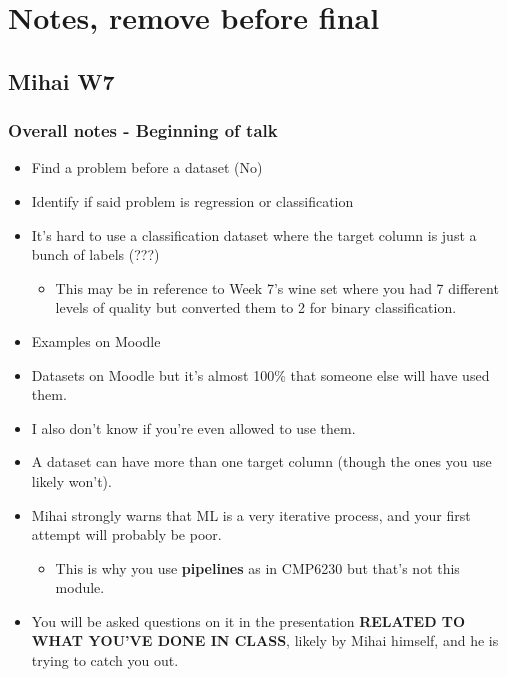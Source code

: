 \documentclass[12pt]{report}
\begin{document}
\chapter*{Notes, remove before final}
\section{Mihai W7}
\subsection{Overall notes - Beginning of talk}
\begin{itemize}
    \item Find a problem before a dataset (No)
    \item Identify if said problem is regression or classification
    \item It's hard to use a classification dataset where the target column is just a bunch of labels (???)
    \begin{itemize}
        \item This may be in reference to Week 7's wine set where you had 7 different levels of quality but converted them to 2 for binary classification.
    \end{itemize}
    \item Examples on Moodle
    \item Datasets on Moodle but it's almost 100\% that someone else will have used them.
    \item I also don't know if you're even allowed to use them.
    \item A dataset can have more than one target column (though the ones you use likely won't).
    \item Mihai strongly warns that ML is a very iterative process, and your first attempt will probably be poor. \begin{itemize}
        \item This is why you use \textbf{pipelines} as in CMP6230 but that's not this module.
    \end{itemize}
    \item You will be asked questions on it in the presentation \textbf{RELATED TO WHAT YOU'VE DONE IN CLASS}, likely
    by Mihai himself, and he is trying to catch you out.
\end{itemize}
\end{document}
